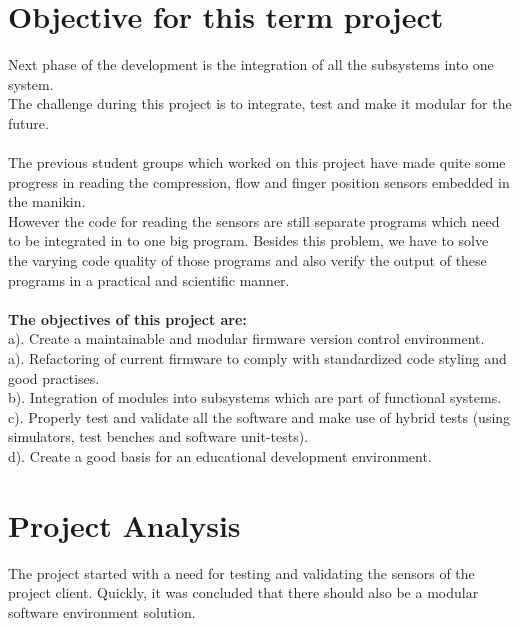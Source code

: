 \section{Objective for this term project}
Next phase of the development is the integration of all the subsystems into one system.\\ 
The challenge during this project is to integrate, test and make it modular for the future. \\ \\ 
The previous student groups which worked on this project have made quite some progress in reading the compression, flow and finger position sensors embedded in the manikin.
\\However the code for reading the sensors are still separate programs which need to be integrated in to one big program. Besides this problem, we have to solve the varying code quality of those programs and also verify the output of these programs in a practical and scientific manner.\\\\
\textbf{The objectives of this project are:}\\
a). Create a maintainable and modular firmware version control environment. \\ 
a). Refactoring of current firmware to comply with standardized code styling and good practises.\\
b). Integration of modules into subsystems which are part of functional systems.\\
c). Properly test and validate all the software and make use of hybrid tests (using simulators, test benches and software unit-tests).\\
d). Create a good basis for an educational development environment.\\

\section {Project Analysis}
The project started with a need for testing and validating the sensors of the project client. Quickly, it was concluded that there should also be a modular software environment solution.
